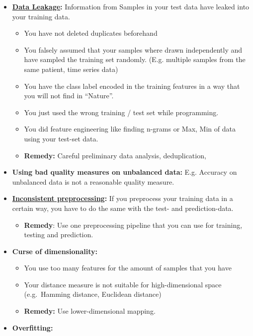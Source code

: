 \documentclass[
]{book}
\providecommand{\tightlist}{%
  \setlength{\itemsep}{0pt}\setlength{\parskip}{0pt}}
\begin{document}
\begin{itemize}
\item
  \href{https://scikit-learn.org/stable/common_pitfalls.html\#data-leakage}{\textbf{Data
  Leakage}}\textbf{:}
  Information from Samples in your test data have leaked into your
  training data.

  \begin{itemize}
  \tightlist
  \item
    You have not deleted duplicates beforehand
  \item
    You falsely assumed that your samples where drawn independently
    and have sampled the training set randomly. (E.g. multiple
    samples from the same patient, time series data)
  \item
    You have the class label encoded in the training features in a
    way that you will not find in ``Nature''.
  \item
    You just used the wrong training / test set while programming.
  \item
    You did feature engineering like finding n-grams or Max, Min of
    data using your test-set data.
  \item
    \textbf{Remedy:} Careful preliminary data analysis, deduplication,
  \end{itemize}
\item
  \textbf{Using bad quality measures on unbalanced data:} E.g. Accuracy on
  unbalanced data is not a reasonable quality measure.
\item
  \href{https://scikit-learn.org/stable/common_pitfalls.html\#inconsistent-preprocessing}{\textbf{Inconsistent
  preprocessing}}\textbf{:}
  If you preprocess your training data in a certain way, you have to
  do the same with the test- and prediction-data.

  \begin{itemize}
  \tightlist
  \item
    \textbf{Remedy}: Use one preprocessing pipeline that you can use for
    training, testing and prediction.
  \end{itemize}
\item
  \textbf{Curse of dimensionality:}

  \begin{itemize}
  \tightlist
  \item
    You use too many features for the amount of samples that you
    have
  \item
    Your distance measure is not suitable for high-dimensional space
    (e.g.~Hamming distance, Euclidean distance)
  \item
    \textbf{Remedy:} Use lower-dimensional mapping.
  \end{itemize}
\item
  \textbf{Overfitting:}


\end{itemize}
\end{document}
